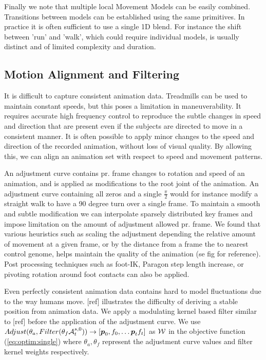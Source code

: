 Finally we note that multiple local Movement Models can be easily combined. Transitions between models can be established using the same primitives. In practice it is often sufficient to use a single 1D blend. For instance the shift between 'run' and 'walk', which could require individual models, is usually distinct and of limited complexity and duration. 

\subsection{Motion Alignment and Filtering}
It is difficult to capture consistent animation data. Treadmills can be used to maintain constant speeds, but this poses a limitation in maneuverability. It requires accurate high frequency control to reproduce the subtle changes in speed and direction that are present even if the subjects are directed to move in a consistent manner. It is often possible to apply minor changes to the speed and direction of the recorded animation, without loss of visual quality. By allowing this, we can align an animation set with respect to speed and movement patterns. 

An adjustment curve contains pr. frame changes to rotation and speed of an animation, and is applied as modifications to the root joint of the animation. An adjustment curve containing all zeros and a single $\frac{\pi}{2}$ would for instance modify a straight walk to have a 90 degree turn over a single frame. To maintain a smooth and subtle modification we can interpolate sparsely distributed key frames and impose limitation on the amount of adjustment allowed pr. frame. We found that various heuristics such as scaling the adjustment depending the relative amount of movement at a given frame, or by the distance from a frame the to nearest control genome, helps maintain the quality of the animation (se fig for reference). Post processing techniques such as foot-IK, Paragon step length increase, or pivoting rotation around foot contacts can also be applied.

Even perfectly consistent animation data contains hard to model fluctuations due to the way humans move. [ref] illustrates the difficulty of deriving a stable position from animation data. We apply a modulating kernel based filter similar to [ref] before the application of the adjustment curve. We use $Adjust(\theta_a,Filter(\theta_f\mathcal{A}^{s,0}_t))\rightarrow{}[\boldsymbol{p }_0,f_0, \ldots \boldsymbol{p }_tf_t]$ as $\mathcal{W}$ in the objective function (\ref{eq:optim:single}) where $\theta_a, \theta_f$ represent the adjustment curve values and filter kernel weights respectively.

